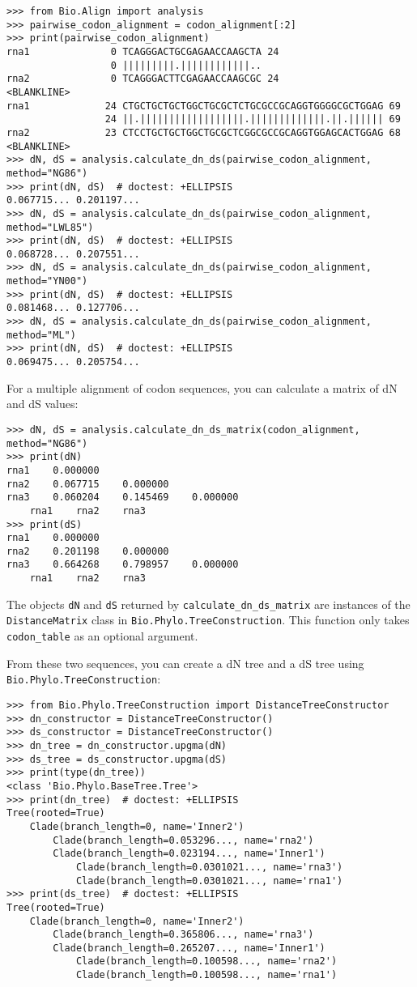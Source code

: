 \begin{verbatim}
>>> from Bio.Align import analysis
>>> pairwise_codon_alignment = codon_alignment[:2]
>>> print(pairwise_codon_alignment)
rna1              0 TCAGGGACTGCGAGAACCAAGCTA 24
                  0 |||||||||.||||||||||||..
rna2              0 TCAGGGACTTCGAGAACCAAGCGC 24
<BLANKLINE>
rna1             24 CTGCTGCTGCTGGCTGCGCTCTGCGCCGCAGGTGGGGCGCTGGAG 69
                 24 ||.||||||||||||||||||.|||||||||||||.||.|||||| 69
rna2             23 CTCCTGCTGCTGGCTGCGCTCGGCGCCGCAGGTGGAGCACTGGAG 68
<BLANKLINE>
>>> dN, dS = analysis.calculate_dn_ds(pairwise_codon_alignment, method="NG86")
>>> print(dN, dS)  # doctest: +ELLIPSIS
0.067715... 0.201197...
>>> dN, dS = analysis.calculate_dn_ds(pairwise_codon_alignment, method="LWL85")
>>> print(dN, dS)  # doctest: +ELLIPSIS
0.068728... 0.207551...
>>> dN, dS = analysis.calculate_dn_ds(pairwise_codon_alignment, method="YN00")
>>> print(dN, dS)  # doctest: +ELLIPSIS
0.081468... 0.127706...
>>> dN, dS = analysis.calculate_dn_ds(pairwise_codon_alignment, method="ML")
>>> print(dN, dS)  # doctest: +ELLIPSIS
0.069475... 0.205754...
\end{verbatim}

For a multiple alignment of codon sequences, you can calculate a matrix of dN and dS values:
\begin{verbatim}
>>> dN, dS = analysis.calculate_dn_ds_matrix(codon_alignment, method="NG86")
>>> print(dN)
rna1    0.000000
rna2    0.067715    0.000000
rna3    0.060204    0.145469    0.000000
    rna1    rna2    rna3
>>> print(dS)
rna1    0.000000
rna2    0.201198    0.000000
rna3    0.664268    0.798957    0.000000
    rna1    rna2    rna3
\end{verbatim}
The objects \verb+dN+ and \verb+dS+ returned by \verb+calculate_dn_ds_matrix+ are instances of the \verb+DistanceMatrix+ class in \verb+Bio.Phylo.TreeConstruction+.
This function only takes \verb+codon_table+ as an optional argument.

From these two sequences, you can create a dN tree and a dS tree using \verb+Bio.Phylo.TreeConstruction+:
\begin{verbatim}
>>> from Bio.Phylo.TreeConstruction import DistanceTreeConstructor
>>> dn_constructor = DistanceTreeConstructor()
>>> ds_constructor = DistanceTreeConstructor()
>>> dn_tree = dn_constructor.upgma(dN)
>>> ds_tree = ds_constructor.upgma(dS)
>>> print(type(dn_tree))
<class 'Bio.Phylo.BaseTree.Tree'>
>>> print(dn_tree)  # doctest: +ELLIPSIS
Tree(rooted=True)
    Clade(branch_length=0, name='Inner2')
        Clade(branch_length=0.053296..., name='rna2')
        Clade(branch_length=0.023194..., name='Inner1')
            Clade(branch_length=0.0301021..., name='rna3')
            Clade(branch_length=0.0301021..., name='rna1')
>>> print(ds_tree)  # doctest: +ELLIPSIS
Tree(rooted=True)
    Clade(branch_length=0, name='Inner2')
        Clade(branch_length=0.365806..., name='rna3')
        Clade(branch_length=0.265207..., name='Inner1')
            Clade(branch_length=0.100598..., name='rna2')
            Clade(branch_length=0.100598..., name='rna1')
\end{verbatim}

